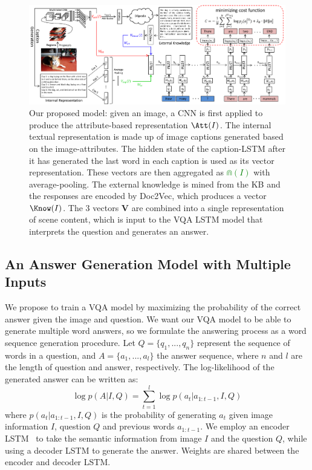 \begin{figure}[t!]
\begin{center}
\includegraphics[width=0.95\linewidth]{img/frame_VQA.pdf}
\end{center}
\vspace{-10pt}
   \caption{Our proposed model: given an image, a CNN is first applied to produce the attribute-based representation \textcolor{red}{$\Att(I)$}. The internal textual representation is made up of image captions generated based on the image-attributes.
   The hidden state of the caption-LSTM after it has generated the last word in each caption is used as its vector representation. These vectors are then aggregated as \textcolor{green}{$\Cap(I)$} with average-pooling. The external knowledge is mined from the KB and the responses are encoded by Doc2Vec, which produces a vector \textcolor{blue}{$\Know(I)$}. The 3 vectors $\mathbf{V}$ are combined into a single representation of scene content, which is input to the VQA LSTM model that interprets the question and generates an answer.
   }
   \label{frame}
   \vspace{-10pt}
\end{figure}


\vspace{-10pt}
\subsection{An Answer Generation Model with Multiple Inputs}
We propose to train a VQA model by maximizing the probability of the correct answer given the image and question. We want our VQA model to be able to generate multiple word answers, so we formulate the answering process as a word sequence generation procedure. Let $Q=\{q_1,...,q_n\}$ represent the sequence of words in a question, and $A=\{a_1,...,a_l\}$ the answer sequence, where $n$ and $l$ are the length of question and answer, respectively. The log-likelihood of the generated answer can be written as: 
\begin{equation}
    \log p(A|I,Q)=\sum_{t=1}^l \log p(a_{t}|a_{1:t-1},I,Q)  
\end{equation}
where $p(a_t|a_{1:t-1},I,Q)$ is the probability of generating $a_t$ given image information $I$, question $Q$ and previous words $a_{1:t-1}$. We employ an encoder LSTM~\cite{hochreiter1997long} to take the semantic information from image $I$ and the question $Q$, while using a decoder LSTM to generate the answer. Weights are shared between the encoder and decoder LSTM.

